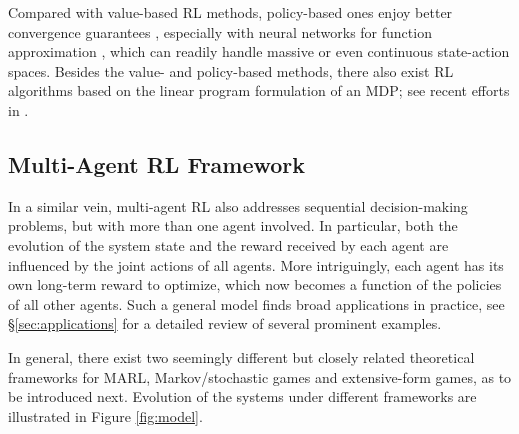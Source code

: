 Compared with value-based RL methods, policy-based ones enjoy better convergence guarantees \cite{konda2000actor,yang2018finite,zhang2019global,agarwal2019optimality}, especially with neural networks for function approximation \cite{liu2019neural,wang2019neural}, which can readily handle massive or even continuous state-action spaces.  
Besides the value- and policy-based methods, there also exist RL algorithms based on the linear program formulation of an MDP; see recent efforts in \cite{chen2016stochastic,wang2017primal}. 
   
  
\subsection{Multi-Agent RL Framework}\label{subsec:MARL_framework}

In a similar vein, multi-agent RL  also addresses  sequential decision-making problems, but with more than one agent involved. In particular, both the evolution of the system state and the reward received by each agent are influenced by the joint actions of all agents. More intriguingly, each agent has its own long-term reward to optimize, which now becomes a function of the  policies of all other agents. Such a general model finds broad applications in practice, see \S\ref{sec:applications} for a detailed review of several prominent examples.


In general, there exist two seemingly different but closely related theoretical frameworks for  MARL, Markov/stochastic games and extensive-form games, as to be introduced next. Evolution of the systems under different frameworks are illustrated in Figure \ref{fig:model}. 
 

  
  
  

